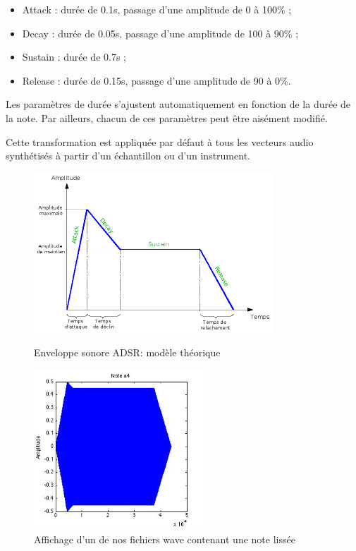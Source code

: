 \documentclass[10pt,a4paper]{article}
\begin{document}
\begin{itemize}
	\item Attack : durée de 0.1s, passage d'une amplitude de 0 à 100\% ;
	\item Decay : durée de 0.05s, passage d'une amplitude de 100 à 90\% ;
	\item Sustain : durée de 0.7s ;
	\item Release : durée de 0.15s, passage d'une amplitude de 90 à 0\%.
\end{itemize}

Les paramètres de durée s'ajustent automatiquement en fonction de la durée de la note. 
Par ailleurs, chacun de ces paramètres peut être aisément modifié. 

Cette transformation est appliquée par défaut à tous les vecteurs audio synthétisés à partir d'un échantillon ou d'un instrument.

\begin{figure}[h!]
    \begin{minipage}[b]{0.4\linewidth}
        \centering \includegraphics[height=6cm]{images/ADSR.png}
        \caption{Enveloppe sonore ADSR: modèle théorique}
    \end{minipage}\hfill
    \begin{minipage}[b]{0.48\linewidth}
        \centering \includegraphics[height=6cm]{images/OurADSR.jpg}
        \caption{Affichage d'un de nos fichiers wave contenant une note lissée}
    \end{minipage}
\end{figure}
\end{document}
